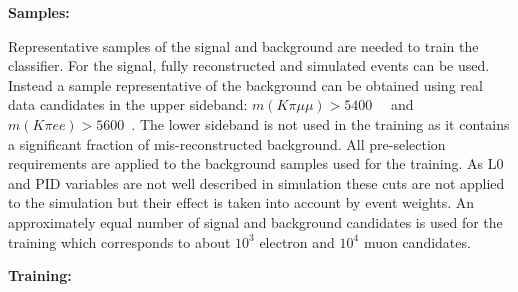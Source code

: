 {\bf Samples:}

Representative samples of the signal and background are needed to train the classifier.
For the signal, fully reconstructed \BdToKstmm and \BdKstee simulated events can be used.
Instead a sample representative of the background can be obtained using real data candidates
in the upper \Bz sideband: $m(K\pi\mu\mu) > 5400$~\mevcc~ and $m(K\pi ee) > 5600$~\mevcc.
The lower sideband is not used in the training as it contains a significant fraction of mis-reconstructed background.
All pre-selection requirements are applied to the background samples used for the training.
As L0 and PID variables are not well described in simulation these cuts are not applied to the simulation
but their effect is taken into account by event weights.
An approximately equal number of signal and background candidates is used for the training
which corresponds to about $10^3$ electron and $10^4$ muon candidates.

{\bf Training:}

